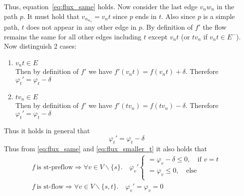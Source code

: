 \documentclass[10pt,a4paper]{article}
\begin{document}
	Thus, equation~\ref{eq:flux_same} holds. Now consider the last edge $v_nw_n$ in the path $p$. It must hold that $v_n_w_n = v_nt$ since $p$ ends in $t$. Also since $p$ is a simple path, $t$ does not appear in any other edge in $p$. By definition of $f'$ the flow remains the same for all other edges including $t$ except $v_nt$ (or $tv_n$ if $v_nt \in E^-$). Now distinguish 2 cases:
	\begin{enumerate}
		\item $v_nt \in E$ \\
		Then by definition of $f'$ we have $f'(v_nt) = f(v_nt) + \delta$. Therefore $\varphi_t' = \varphi_t - \delta$
		
		\item $tv_n \in E$ \\
		Then by definition of $f'$ we have $f'(tv_n) = f(tv_n) - \delta$. Therefore $\varphi_t' = \varphi_t - \delta$
	\end{enumerate}
	Thus it holds in general that 
	\begin{equation}
	\label{eq:flux_smaller_t}
	\varphi_t' = \varphi_t - \delta
	\end{equation}
	Thus from \ref{eq:flux_same} and \ref{eq:flux_smaller_t} it also holds that
		\begin{align}
		\label{eq:flux_cond_satis}
		f~\text{is st-preflow} \Rightarrow \forall v \in V \backslash \{s\}. \quad \varphi_v' 
		\begin{cases}
		= \varphi_v - \delta \leq 0, \quad \text{if } v=t\\
		= \varphi_v \leq 0,  \quad \text{else} \\
		\end{cases} \\
		f~\text{is st-flow} \Rightarrow \forall v \in V \backslash \{s,t\}. \quad  
		\varphi_v' = \varphi_v = 0 
		\end{align}
		
\end{document}
